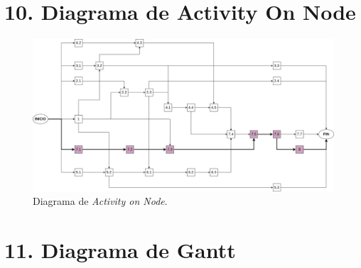 \documentclass[
11pt, %
codirector, %
]{charter}
\begin{document}
\section{10. Diagrama de Activity On Node}
\label{sec:AoN}






\begin{landscape}
\begin{figure}[htpb]
\centering 
\includegraphics[width=1.5\textwidth]{./Figuras/MonoSLAM-AoN.png}
\caption{Diagrama de \textit{Activity on Node}.}
\label{fig:AoN}
\end{figure}
\end{landscape}




\section{11. Diagrama de Gantt}
\label{sec:gantt}

\end{document}
